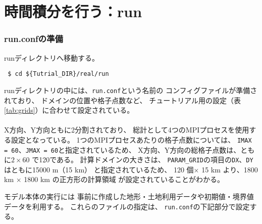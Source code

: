 
\section{時間積分を行う：run}
\subsubsection{run.confの準備}
runディレクトリへ移動する。
\begin{verbatim}
 $ cd ${Tutrial_DIR}/real/run
\end{verbatim}
%
runディレクトリの中には、\verb|run.conf|という名前の
コンフィグファイルが準備されており、
ドメインの位置や格子点数など、
チュートリアル用の設定（表\ref{tab:grids}）に合わせて設定されている。\\

\\


X方向、Y方向ともに2分割されており、
総計として4つのMPIプロセスを使用する設定となっている。
1つのMPIプロセスあたりの格子点数については、
\verb|IMAX = 60|、\verb|JMAX = 60|と指定されているため、
X方向、Y方向の総格子点数は、ともに$2 \times 60$ で120である。
計算ドメインの大きさは、
\verb|PARAM_GRID|の項目の\verb|DX|、\verb|DY|はともに15000 m（15 km）
と指定されているため、
120 個$\times$ 15 km より、1800 km $\times$ 1800 km の正方形の計算領域
が設定されていることがわかる。


モデル本体の実行には
事前に作成した地形・土地利用データや初期値・境界値データを利用する。
これらのファイルの指定は、
\verb|run.conf|の下記部分で設定する。\\

